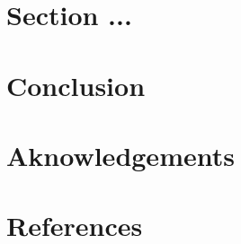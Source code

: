 \documentclass[a4paper, 12pt,oneside]{article}
\begin{document}
	\section{Section ...}
	\section{Conclusion}
	\section*{Aknowledgements}
	\section*{References}
\end{document}
